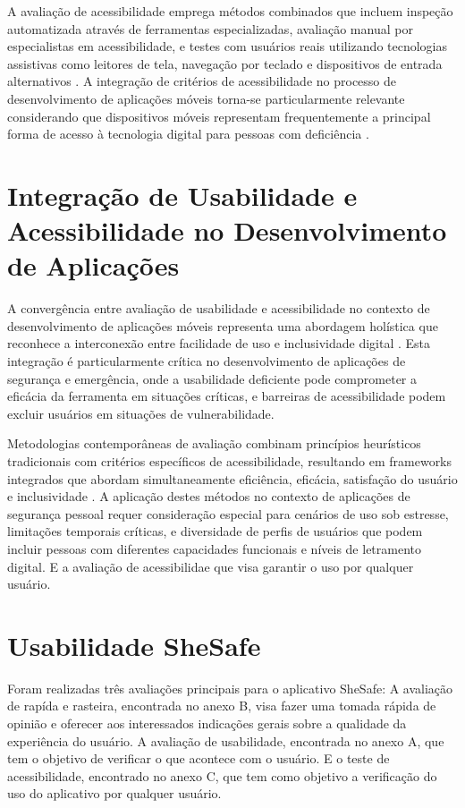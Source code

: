 A avaliação de acessibilidade emprega métodos combinados que incluem inspeção automatizada através de ferramentas especializadas, avaliação manual por especialistas em acessibilidade, e testes com usuários reais utilizando tecnologias assistivas como leitores de tela, navegação por teclado e dispositivos de entrada alternativos \cite{abascal2019inclusive}. A integração de critérios de acessibilidade no processo de desenvolvimento de aplicações móveis torna-se particularmente relevante considerando que dispositivos móveis representam frequentemente a principal forma de acesso à tecnologia digital para pessoas com deficiência \cite{trewin2013mobile}.

\section{Integração de Usabilidade e Acessibilidade no Desenvolvimento de Aplicações}
A convergência entre avaliação de usabilidade e acessibilidade no contexto de desenvolvimento de aplicações móveis representa uma abordagem holística que reconhece a interconexão entre facilidade de uso e inclusividade digital \cite{power2012equal}. Esta integração é particularmente crítica no desenvolvimento de aplicações de segurança e emergência, onde a usabilidade deficiente pode comprometer a eficácia da ferramenta em situações críticas, e barreiras de acessibilidade podem excluir usuários em situações de vulnerabilidade.

Metodologias contemporâneas de avaliação combinam princípios heurísticos tradicionais com critérios específicos de acessibilidade, resultando em frameworks integrados que abordam simultaneamente eficiência, eficácia, satisfação do usuário e inclusividade \cite{yesilada2015evaluating}. A aplicação destes métodos no contexto de aplicações de segurança pessoal requer consideração especial para cenários de uso sob estresse, limitações temporais críticas, e diversidade de perfis de usuários que podem incluir pessoas com diferentes capacidades funcionais e níveis de letramento digital. E a avaliação de acessibilidae que visa garantir o uso por qualquer usuário.

\section{Usabilidade SheSafe}

Foram realizadas três avaliações principais para o aplicativo SheSafe: A avaliação de rapída e rasteira, encontrada no anexo B, visa fazer uma tomada rápida de opinião e oferecer aos interessados indicações gerais sobre a qualidade da experiência do usuário. A avaliação de usabilidade, encontrada no anexo A, que tem o objetivo de verificar o que acontece com o usuário. E o teste de acessibilidade, encontrado no anexo C, que tem como objetivo a verificação do uso do aplicativo por qualquer usuário.

